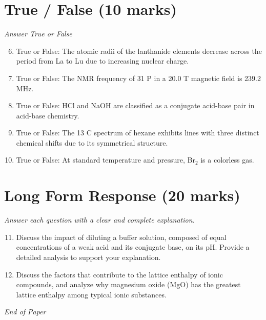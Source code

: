 \documentclass[12pt]{article}
\begin{document}
\section*{True / False (10 marks)}
\textit{Answer True or False}
\begin{enumerate}[label=\arabic*.]
\setcounter{enumi}{5}
\item True or False: The atomic radii of the lanthanide elements decrease across the period from La to Lu due to increasing nuclear charge.
\item True or False: The NMR frequency of 31 P in a 20.0 T magnetic field is 239.2 MHz.
\item True or False: HCl and NaOH are classified as a conjugate acid-base pair in acid-base chemistry.
\item True or False: The 13 C spectrum of hexane exhibits lines with three distinct chemical shifts due to its symmetrical structure.
\item True or False: At standard temperature and pressure, Br$_{2}$ is a colorless gas.
\end{enumerate}

\section*{Long Form Response (20 marks)}
\textit{Answer each question with a clear and complete explanation.}
\begin{enumerate}[label=\arabic*.]
\setcounter{enumi}{10}
\item Discuss the impact of diluting a buffer solution, composed of equal concentrations of a weak acid and its conjugate base, on its pH. Provide a detailed analysis to support your explanation.
\item Discuss the factors that contribute to the lattice enthalpy of ionic compounds, and analyze why magnesium oxide (MgO) has the greatest lattice enthalpy among typical ionic substances.
\end{enumerate}

\vfill
\noindent\textit{End of Paper}
\end{document}

